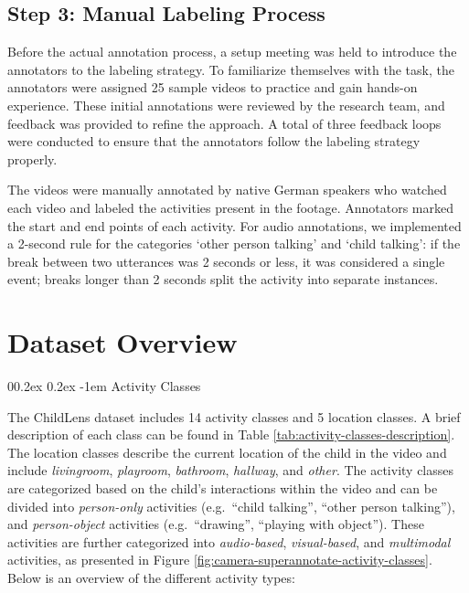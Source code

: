 \documentclass[
  man,floatsintext]{apa6}
\makeatletter
\let\oldparagraph\paragraph
\renewcommand{\paragraph}{
    \@ifstar
      \xxxParagraphStar
      \xxxParagraphNoStar
  }
\newcommand{\xxxParagraphStar}[1]{\oldparagraph*{#1}\mbox{}}
\newcommand{\xxxParagraphNoStar}[1]{\oldparagraph{#1}\mbox{}}
\renewcommand{\paragraph}{\@startsection{paragraph}{4}{\parindent}%
  {0\baselineskip \@plus 0.2ex \@minus 0.2ex}%
  {-1em}%
  {\normalfont\normalsize\bfseries\itshape\typesectitle}}
\makeatother
\begin{document}
\subsection{Step 3: Manual Labeling Process}\label{step-3-manual-labeling-process}

Before the actual annotation process, a setup meeting was held to introduce the annotators to the labeling strategy. To familiarize themselves with the task, the annotators were assigned 25 sample videos to practice and gain hands-on experience. These initial annotations were reviewed by the research team, and feedback was provided to refine the approach. A total of three feedback loops were conducted to ensure that the annotators follow the labeling strategy properly.

The videos were manually annotated by native German speakers who watched each video and labeled the activities present in the footage. Annotators marked the start and end points of each activity. For audio annotations, we implemented a 2-second rule for the categories `other person talking' and `child talking': if the break between two utterances was 2 seconds or less, it was considered a single event; breaks longer than 2 seconds split the activity into separate instances.

\section{Dataset Overview}\label{dataset-overview}

\paragraph{Activity Classes}\label{activity-classes}

The ChildLens dataset includes 14 activity classes and 5 location classes. A brief description of each class can be found in Table \ref{tab:activity-classes-description}. The location classes describe the current location of the child in the video and include \emph{livingroom}, \emph{playroom}, \emph{bathroom}, \emph{hallway}, and \emph{other}.
The activity classes are categorized based on the child's interactions within the video and can be divided into \emph{person-only} activities (e.g.~``child talking'', ``other person talking''), and \emph{person-object} activities (e.g.~``drawing'', ``playing with object''). These activities are further categorized into \emph{audio-based}, \emph{visual-based}, and \emph{multimodal} activities, as presented in Figure \ref{fig:camera-superannotate-activity-classes}. Below is an overview of the different activity types:
\end{document}
